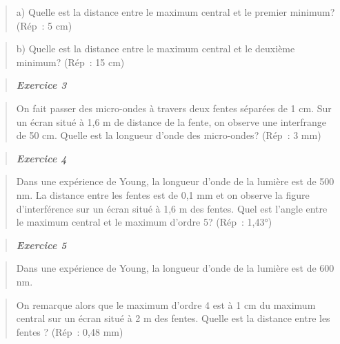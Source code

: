\begin{quote}
a) Quelle est la distance entre le maximum central et le premier
minimum? (Rép~: 5 cm)
\end{quote}

\begin{quote}
b) Quelle est la distance entre le maximum central et le deuxième
minimum? (Rép~: 15 cm)
\end{quote}

\begin{quote}
\end{quote}

\begin{quote}
\emph{\textbf{Exercice 3}}
\end{quote}

\begin{quote}
On fait passer des micro-ondes à travers deux fentes séparées de 1 cm.
Sur un écran situé à 1,6 m de distance de la fente, on observe une
interfrange de 50 cm. Quelle est la longueur d'onde des micro-ondes?
(Rép~: 3 mm)
\end{quote}

\begin{quote}
\end{quote}

\begin{quote}
\emph{\textbf{Exercice 4}}
\end{quote}

\begin{quote}
Dans une expérience de Young, la longueur d'onde de la lumière est de
500 nm. La distance entre les fentes est de 0,1 mm et on observe la
figure d'interférence sur un écran situé à 1,6 m des fentes. Quel est
l'angle entre le maximum central et le maximum d'ordre 5? (Rép~: 1,43°)
\end{quote}

\begin{quote}
\end{quote}

\begin{quote}
\emph{\textbf{Exercice 5}}
\end{quote}

\begin{quote}
Dans une expérience de Young, la longueur d'onde de la lumière est de
600 nm.
\end{quote}

\begin{quote}
On remarque alors que le maximum d'ordre 4 est à 1 cm du maximum central
sur un écran situé à 2 m des fentes. Quelle est la distance entre les
fentes\textbf{ }? (Rép~: 0,48 mm)
\end{quote}

